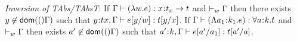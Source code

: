 \begin{lemma}
    {\em Inversion of TAbs/TAbsT}: If $\hastype{\tcenv}{(\lambda w. e)}{x\bindt t_x->t}$ and $\vdash_w \tcenv$ then there exists $y \not\in \dom(\tcenv)$ such that $\hastype{y\bindt tx,\tcenv}{e[y/w]}{t[y/x]}$.  If $\hastype{\tcenv}{(\Lambda a_1\bindt k_1. e)}{\forall a\bindt k. t}$ and $\vdash_w \tcenv$ then exists $a' \not\in \dom(\tcenv)$ such that $\hastype{a'\bindt k,\tcenv}{e[a'/a_1]}{t[a'/a]}$. %
\end{lemma}